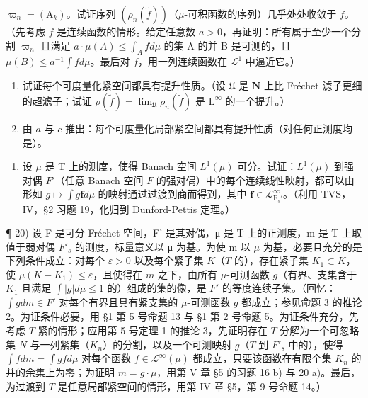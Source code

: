 \(\varpi_{n} = (\mathrm{A}_{k})\)。试证序列 \((\rho_{n}(\tilde{f}))\)（\(\mu\)-可积函数的序列）几乎处处收敛于 \(f\)。（先考虑 \(f\) 是连续函数的情形。给定任意数 \(a > 0\)，再证明：所有属于至少一个分割 \(\varpi_{n}\) 且满足 \(a \cdot \mu(A) \leqslant \int_{A} f d\mu\) 的集 A 的并 B 是可测的，且 \(\mu(B) \leqslant a^{-1} \int f d\mu\)。最后对 \(f\)，用一列连续函数在 \(\mathcal{L}^{1}\) 中逼近它。）

\begin{enumerate}
\def\labelenumi{\alph{enumi})}
\setcounter{enumi}{2}
\item
  试证每个可度量化紧空间都具有提升性质。（设 \(\mathfrak{U}\) 是 \(\mathbf{N}\) 上比 Fréchet 滤子更细的超滤子；试证 \(\rho(\widetilde{f}) = \lim_{\mathfrak{U}} \rho_n(\widetilde{f})\) 是 \(\mathrm{L}^{\infty}\) 的一个提升。）
\item
  由 \(a\) 与 \(c\) 推出：每个可度量化局部紧空间都具有提升性质（对任何正测度均是）。
\end{enumerate}

\begin{enumerate}
\def\labelenumi{\arabic{enumi})}
\setcounter{enumi}{18}
\tightlist
\item
  设 \(\mu\) 是 T 上的测度，使得 Banach 空间 \(L^1 (\mu)\) 可分。试证：\(L^1 (\mu)\) 到强对偶 \(F'\)（任意 Banach 空间 \(F\) 的强对偶）中的每个连续线性映射，都可以由形如 \(g\mapsto \int g\mathbf{f}d\mu\) 的映射通过过渡到商而得到，其中 \(\mathbf{f}\in \mathcal{L}_{\mathrm{F}_s'}^\infty\)。（利用 TVS，IV，§2 习题 19，化归到 Dunford-Pettis 定理。）
\end{enumerate}

¶ 20) 设 F 是可分 Fréchet 空间，F' 是其对偶，μ 是 T 上的正测度，m 是 T 上取值于弱对偶 \(F'_s\) 的测度，标量意义以 μ 为基。为使 m 以 \(\mu\) 为基，必要且充分的是下列条件成立：对每个 \(\varepsilon > 0\) 以及每个紧子集 \(K\)（\(T\) 的），存在紧子集 \(K_1 \subset K\)，使 \(\mu(K - K_1) \leqslant \varepsilon\)，且使得在 \(m\) 之下，由所有 \(\mu\)-可测函数 \(g\)（有界、支集含于 \(K_1\) 且满足 \(\int |g| d\mu \leqslant 1\) 的）组成的集的像，是 \(F'\) 的等度连续子集。（回忆：\(\int g dm \in F'\) 对每个有界且具有紧支集的 \(\mu\)-可测函数 \(g\) 都成立；参见命题 3 的推论 2。为证条件必要，用 §1 第 5 号命题 13 与 §1 第 2 号命题 5。为证条件充分，先考虑 \(T\) 紧的情形；应用第 5 号定理 1 的推论 3，先证明存在 \(T\) 分解为一个可忽略集 \(N\) 与一列紧集（\(K_n\)）的分割，以及一个可测映射 \(g\)（\(T\) 到 \(F'_s\) 中的），使得 \(\int f dm = \int g f d\mu\) 对每个函数 \(f \in \mathcal{L}^\infty(\mu)\) 都成立，只要该函数在有限个集 \(K_n\) 的并的余集上为零；为证明 \(m = g \cdot \mu\)，用第 V 章 §5 的习题 16 b) 与 20 a)。最后，为过渡到 \(T\) 是任意局部紧空间的情形，用第 IV 章 §5，第 9 号命题 14。）


